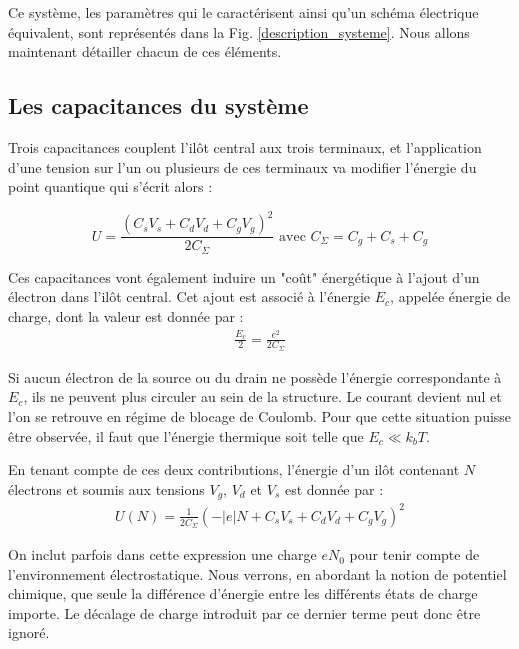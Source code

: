 Ce système, les paramètres qui le caractérisent ainsi qu'un schéma électrique équivalent, sont représentés dans la Fig. \ref{description_systeme}. Nous allons maintenant détailler chacun de ces éléments.


\subsection{Les capacitances du système}
Trois capacitances couplent l'il\^ot central aux trois terminaux, et l'application d'une tension sur l'un ou plusieurs de ces terminaux va modifier l'énergie du point quantique qui s'écrit alors :

\begin{equation}
U = \frac{(C_sV_s + C_dV_d + C_gV_g)^2}{2C_{\Sigma}}
\text{   avec    } 
 C_{\Sigma} = C_g + C_s + C_g \nonumber
\end{equation}

Ces capacitances vont également induire un "co\^ut" énergétique à l'ajout d'un électron dans l'il\^ot central. Cet ajout est associé à l'énergie $E_c$, appelée énergie de charge, dont la valeur est donnée par :
\begin{eqnarray}
\frac{E_c}{2} = \frac{e^2}{2C_{\Sigma}} \nonumber
\end{eqnarray}

Si aucun électron de la source ou du drain ne possède l'énergie correspondante à $E_c$, ils ne peuvent plus circuler au sein de la structure. Le courant devient nul et l'on se retrouve en régime de blocage de Coulomb. Pour que cette situation puisse être observée, il faut que l'énergie thermique soit telle que $E_c \ll k_bT$.

En tenant compte de ces deux contributions, l'énergie d'un il\^ot contenant $N$ électrons et soumis aux tensions $V_g$, $V_d$ et $V_s$ est donnée par :
\begin{eqnarray}
U(N) = \frac{1}{2C_{\Sigma}} (-|e|N + C_sV_s + C_dV_d + C_gV_g)^2
\end{eqnarray}

On inclut parfois dans cette expression une charge $eN_0$ pour tenir compte de l'environnement électrostatique. Nous verrons, en abordant la notion de potentiel chimique, que seule la différence d'énergie entre les différents états de charge importe. Le décalage de charge introduit par ce dernier terme peut donc \^etre ignoré. \newline


